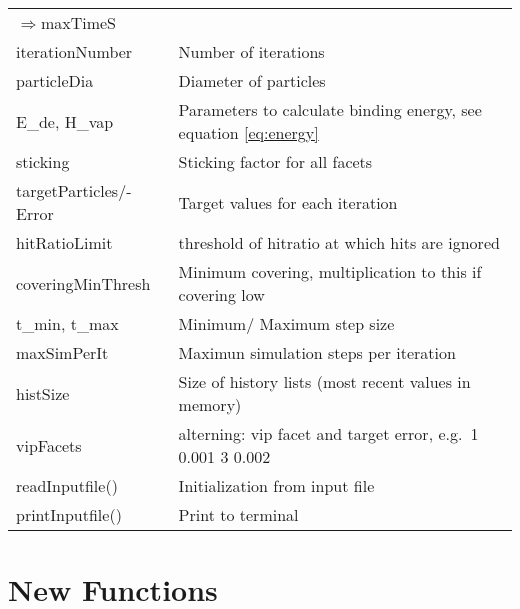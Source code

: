 \begin{center}
\begin{tabular}{|l|l|}
\enskip$\Rightarrow$maxTimeS&\\
\rule{0pt}{3ex} iterationNumber& Number of iterations\\
\rule{0pt}{3ex} particleDia& Diameter of particles\\
\rule{0pt}{3ex}  E\_de, H\_vap& Parameters to calculate binding energy, see equation \ref{eq:energy}\\ %
\rule{0pt}{3ex}  sticking&  Sticking factor for all facets\\
\rule{0pt}{3ex}  targetParticles/-Error&  Target values for each iteration\\
\rule{0pt}{3ex}  hitRatioLimit&  threshold of hitratio at which hits are ignored\\
\rule{0pt}{3ex}  coveringMinThresh&  Minimum covering, multiplication to this if covering low\\
\rule{0pt}{3ex}  t\_min, t\_max&  Minimum/ Maximum step size\\
\rule{0pt}{3ex}  maxSimPerIt&  Maximun simulation steps per iteration\\
\rule{0pt}{3ex}  histSize&  Size of history lists (most recent values in memory)\\
\rule{0pt}{3ex}  vipFacets&  alterning: vip facet and target error, e.g.\ 1 0.001 3 0.002\\
\hline
\rule{0pt}{3ex} readInputfile()& Initialization from input file\\
\rule{0pt}{3ex} printInputfile()& Print to terminal\\
\hline
\end{tabular}
\end{center}

\section{New Functions}
